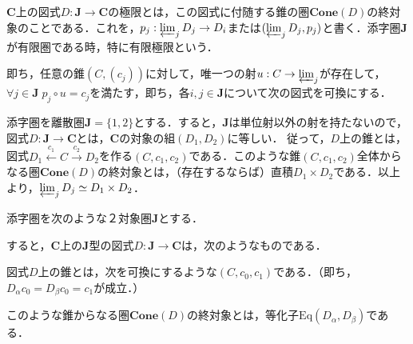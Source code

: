 \documentclass[uplatex, dvipdfmx]{jsarticle}
\begin{document}
\begin{definition}[limit]
    $\mathbf{C}$上の図式$D:\mathbf{J}\to\mathbf{C}$の極限とは，この図式に付随する錐の圏$\mathbf{Cone}(D)$の終対象のことである．これを，$p_j:\varprojlim_jD_j\to D_i$または$(\varprojlim_jD_j,p_j)$と書く．添字圏$\mathbf{J}$が有限圏である時，特に有限極限という．

    即ち，任意の錐$(C,(c_j))$に対して，唯一つの射$u:C\to\varprojlim_j$が存在して，$\forall j\in\mathbf{J}\; p_j\circ u=c_j$を満たす，即ち，各$i,j\in\mathbf{J}$について次の図式を可換にする．
    \begin{center}
    \end{center}
\end{definition}

\begin{example}[直積]\label{example-product}
    添字圏を離散圏$\mathbf{J}=\{1,2\}$とする．すると，$\mathbf{J}$は単位射以外の射を持たないので，図式$D:\mathbf{J}\to\mathbf{C}$とは，$\mathbf{C}$の対象の組$(D_1,D_2)$に等しい．
    従って，$D$上の錐とは，図式$D_1\xleftarrow{c_1}C\xrightarrow{c_2}D_2$を作る$(C,c_1,c_2)$である．このような錐$(C,c_1,c_2)$全体からなる圏$\mathbf{Cone}(D)$の終対象とは，（存在するならば）直積$D_1\times D_2$である．以上より，$\varprojlim_jD_j\simeq D_1\times D_2$．
\end{example}

\begin{example}[等化子]\label{example-equalizer}
    添字圏を次のような２対象圏$\mathbf{J}$とする．
    \begin{center}
    \end{center}
    すると，$\mathbf{C}$上の$\mathbf{J}$型の図式$D:\mathbf{J}\to\mathbf{C}$は，次のようなものである．
    \begin{center}
    \end{center}
    図式$D$上の錐とは，次を可換にするような$(C,c_0,c_1)$である．（即ち，$D_\alpha c_0=D_\beta c_0=c_1$が成立．）
    \begin{center}
    \end{center}
    このような錐からなる圏$\mathbf{Cone}(D)$の終対象とは，等化子$\mathrm{Eq}(D_\alpha,D_\beta)$である．
\end{example}
\end{document}
